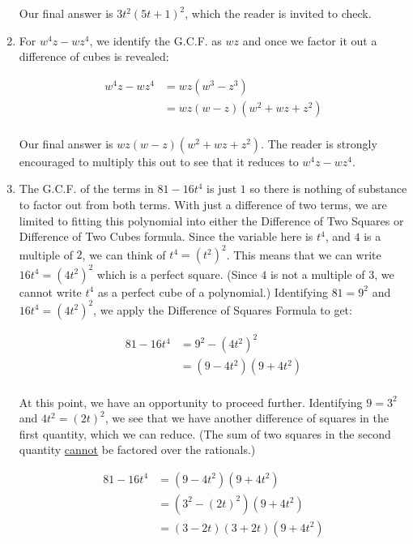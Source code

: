 \begin{ex}
\begin{enumerate}
Our final answer is $3t^2 (5t+1)^2$, which the reader is invited to check.

\item  For $w^4 z - w z^4$, we identify the G.C.F. as $wz$ and once we factor it out a difference of cubes is revealed:

\begin{align*}
w^4 z - w z^4 & = wz(w^3 - z^3) \tag{Factor out G.C.F.} \\
& = wz(w-z)(w^2+wz+z^2) \tag{Difference of Cubes, $a=w$, $b = z$} \\
\end{align*}

Our final answer is $wz(w-z)(w^2+wz+z^2)$.  The reader is strongly encouraged to multiply this out to see that it reduces to $w^4 z - w z^4$.

\item  The G.C.F. of the terms in $81 - 16t^4$ is just $1$ so there is nothing of substance to factor out from both terms.  With just a difference of two terms, we are limited to fitting this polynomial into either the Difference of Two Squares or Difference of Two Cubes formula. Since the variable here is $t^4$, and $4$ is a multiple of $2$, we can think of $t^4 = (t^2)^2$.  This means that we can write $16t^4 = (4t^2)^2$ which is a perfect square.  (Since $4$ is not a multiple of $3$, we cannot write $t^4$ as a perfect cube of a polynomial.)  Identifying $81 = 9^2$ and $16t^4 = (4t^2)^2$, we apply the Difference of Squares Formula to get:

\begin{align*}
81 - 16t^4 & = 9^2 - (4t^2)^2 \\
& = (9-4t^2)(9+4t^2) \tag{Difference of Squares, $a = 9$, $b = 4t^2$} \\
\end{align*}

At this point, we have an opportunity to proceed further.  Identifying $9 = 3^2$ and $4t^2 = (2t)^2$, we see that we have another difference of squares in the first quantity, which we can reduce. (The sum of two squares in the second quantity \underline{cannot} be factored over the rationals.)

\begin{align*}
81 - 16t^4 & = (9-4t^2)(9+4t^2) \\
& = (3^2 - (2t)^2) (9 + 4t^2) \\
& = (3 - 2t)(3+2t)(9 + 4t^2) \tag{Difference of Squares, $a = 3$, $b = 2t$} \\
\end{align*}


\end{enumerate}
\end{ex}
